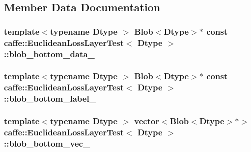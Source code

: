\subsection{Member Data Documentation}
\hypertarget{classcaffe_1_1_euclidean_loss_layer_test_aa502435549ee6a7597a60f66aaecc4ea}{
\subsubsection[{blob\+\_\+bottom\+\_\+data\+\_\+}]{\setlength{\rightskip}{0pt plus 5cm}template$<$typename Dtype $>$ {\bf Blob}$<$Dtype$>$$\ast$ const {\bf caffe\+::\+Euclidean\+Loss\+Layer\+Test}$<$ Dtype $>$\+::blob\+\_\+bottom\+\_\+data\+\_\+\hspace{0.3cm}{\ttfamily [protected]}}}\label{classcaffe_1_1_euclidean_loss_layer_test_aa502435549ee6a7597a60f66aaecc4ea}
\hypertarget{classcaffe_1_1_euclidean_loss_layer_test_ae2509956f3d64e647a9e704c428189ae}{
\subsubsection[{blob\+\_\+bottom\+\_\+label\+\_\+}]{\setlength{\rightskip}{0pt plus 5cm}template$<$typename Dtype $>$ {\bf Blob}$<$Dtype$>$$\ast$ const {\bf caffe\+::\+Euclidean\+Loss\+Layer\+Test}$<$ Dtype $>$\+::blob\+\_\+bottom\+\_\+label\+\_\+\hspace{0.3cm}{\ttfamily [protected]}}}\label{classcaffe_1_1_euclidean_loss_layer_test_ae2509956f3d64e647a9e704c428189ae}
\hypertarget{classcaffe_1_1_euclidean_loss_layer_test_ace037a9615b21b31c469aee9fcdf76ae}{
\subsubsection[{blob\+\_\+bottom\+\_\+vec\+\_\+}]{\setlength{\rightskip}{0pt plus 5cm}template$<$typename Dtype $>$ vector$<${\bf Blob}$<$Dtype$>$$\ast$$>$ {\bf caffe\+::\+Euclidean\+Loss\+Layer\+Test}$<$ Dtype $>$\+::blob\+\_\+bottom\+\_\+vec\+\_\+\hspace{0.3cm}{\ttfamily [protected]}}}\label{classcaffe_1_1_euclidean_loss_layer_test_ace037a9615b21b31c469aee9fcdf76ae}
